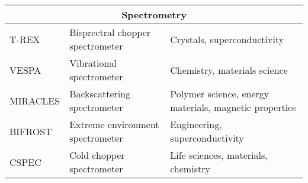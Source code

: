 \begin{table}[ht]
\begin{tabularx}{\linewidth}{lXp{128pt}}
    \midrule

    \multicolumn{3}{c}{Spectrometry}                                                                               \\
    \midrule
    T-REX      & Bisprectral chopper spectrometer         & Crystals, superconductivity                            \\
    VESPA      & Vibrational spectrometer                 & Chemistry, materials science                           \\
    MIRACLES   & Backscattering spectrometer              & Polymer science, energy materials, magnetic properties \\
    BIFROST    & Extreme environment spectrometer         & Engineering, superconductivity                         \\
    CSPEC      & Cold chopper spectrometer                & Life sciences,  materials, chemistry                   \\

    \bottomrule
  \end{tabularx}
\end{table}
